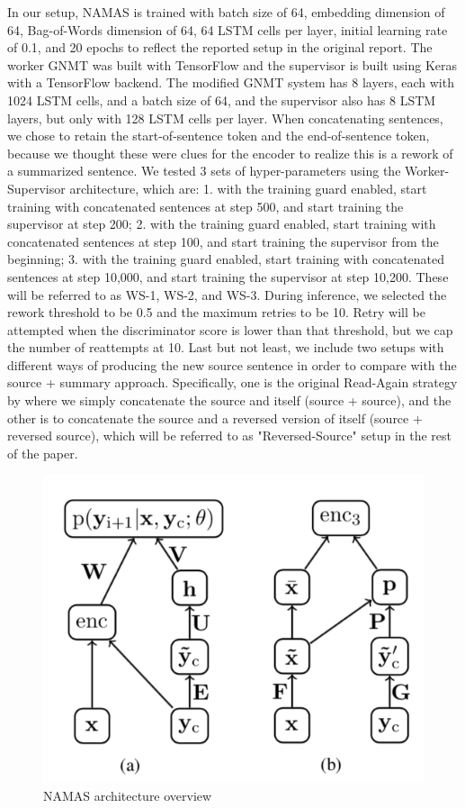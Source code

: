 \documentclass[letterpaper]{article} %
\begin{document}
In our setup, NAMAS is trained with batch size of 64, embedding dimension of 64, Bag-of-Words dimension of 64, 64 LSTM cells per layer, initial learning rate of 0.1, and 20 epochs to reflect the reported setup in the original report. The worker GNMT was built with TensorFlow \cite{tensorflow2015-whitepaper} and the supervisor is built using Keras \cite{chollet2015keras} with a TensorFlow backend. The modified GNMT system has 8 layers, each with 1024 LSTM cells, and a batch size of 64, and the supervisor also has 8 LSTM layers, but only with 128 LSTM cells per layer. When concatenating sentences, we chose to retain the start-of-sentence token and the end-of-sentence token, because we thought these were clues for the encoder to realize this is a rework of a summarized sentence. We tested 3 sets of hyper-parameters using the Worker-Supervisor architecture, which are: 1. with the training guard enabled, start training with concatenated sentences at step 500, and start training the supervisor at step 200; 2. with the training guard enabled, start training with concatenated sentences at step 100, and start training the supervisor from the beginning; 3. with the training guard enabled, start training with concatenated sentences at step 10,000, and start training the supervisor at step 10,200. These will be referred to as WS-1, WS-2, and WS-3. During inference, we selected the rework threshold to be 0.5 and the maximum retries to be 10. Retry will be attempted when the discriminator score is lower than that threshold, but we cap the number of reattempts at 10. Last but not least, we include two setups with different ways of producing the new source sentence in order to compare with the source + summary approach. Specifically, one is the original Read-Again strategy by \cite{zeng2016efficient} where we simply concatenate the source and itself (source + source), and the other is to concatenate the source and a reversed version of itself (source + reversed source), which will be referred to as "Reversed-Source" setup in the rest of the paper.

\begin{figure}[h]
	\includegraphics[scale=0.6]{NAMAS}
	\centering
	\caption{NAMAS architecture overview \cite{rush2015neural}}
	\label{fig:namas}
\end{figure}
\end{document}
